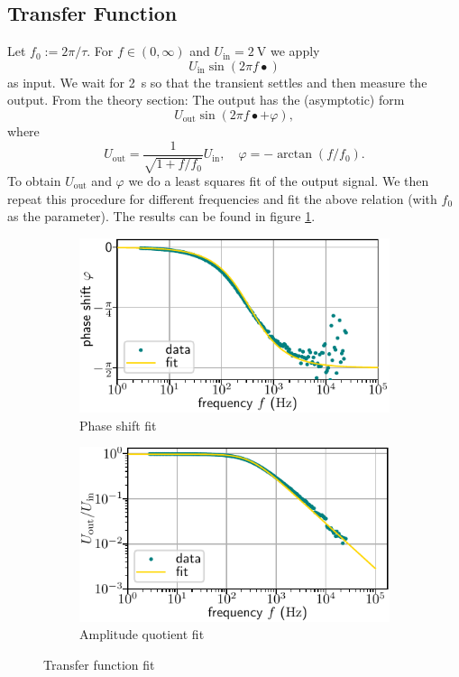 \documentclass[10pt, a4paper]{article} %
\begin{document}
\subsection{Transfer Function}
Let $f_0 := 2\pi /\tau$.
For $f \in (0, \infty)$ and $U_\mathrm{in} =\SI{2}{\volt}$ we apply
\begin{equation*}
	U_\mathrm{in} \sin ( 2\pi f \bullet)
\end{equation*}
as input.
We wait for \SI{2}{\second} so that the transient settles and then measure the output.
From the theory section: The output has the (asymptotic) form
\begin{equation*}
	U_\mathrm{out} \sin (2 \pi f \bullet + \varphi),
\end{equation*}
where 
\begin{equation*}
	U_\mathrm{out} = \frac{1}{\sqrt{1+ f/f_0}} U_\mathrm{in}, \quad \varphi = - \arctan ( f /f_0).
\end{equation*}
To obtain $U_\mathrm{out}$ and $\varphi$ we do a least squares fit of the output signal.
We then repeat this procedure for different frequencies and fit the above relation (with $f_0$ as the parameter). The results can be found in figure \ref{fig:tf}.
  \begin{figure}
     \centering
     \begin{subfigure}{0.495\textwidth}
	     \includegraphics[width=\textwidth]{shifts.pdf}
         \caption{Phase shift fit}
     \end{subfigure}
	  \begin{subfigure}{0.495\textwidth}
	     \includegraphics[width=\textwidth]{quots.pdf}
         \caption{Amplitude quotient fit}
     \end{subfigure}
	  \caption{Transfer function fit}
        \label{fig:tf}
\end{figure}
\end{document}
